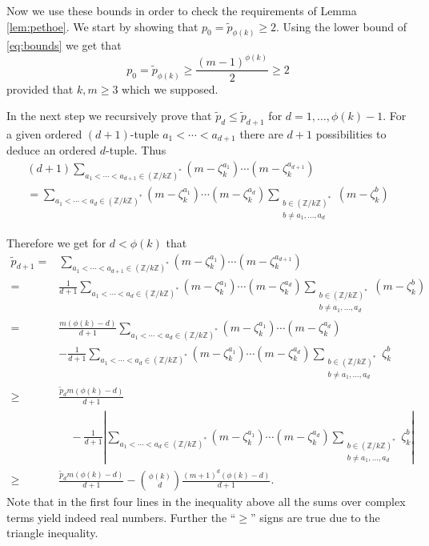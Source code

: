 \documentclass{amsart}
\theoremstyle{plain}
\numberwithin{equation}{section}
\theoremstyle{remark}
\begin{document}
Now we use these bounds in order to check the requirements of Lemma
\ref{lem:pethoe}. We start by showing that $p_0=\tilde p_{\phi(k)}\geq
2$. Using the lower bound of \eqref{eq:bounds} we get that
\[p_0=\tilde p_{\phi(k)}\geq\frac{(m-1)^{\phi(k)}}2\geq2\]
provided that $k,m\geq3$ which we supposed.

In the next step we recursively prove that $\tilde p_d\leq\tilde
p_{d+1}$ for $d=1,\ldots,\phi(k)-1$. For a given ordered $(d+1)$-tuple
$a_1<\cdots<a_{d+1}$ there are $d+1$ possibilities to deduce an
ordered $d$-tuple. Thus
\begin{multline*}(d+1)\sum_{a_1<\cdots<a_{d+1}\in({{\mathbb Z}}/k{{\mathbb Z}})^*}(m-\zeta_k^{a_1})\cdots(m-\zeta_k^{a_{d+1}})\\
=\sum_{a_1<\cdots<a_{d}\in({{\mathbb Z}}/k{{\mathbb Z}})^*}(m-\zeta_k^{a_1})\cdots(m-\zeta_k^{a_{d}})\sum_{\substack{b\in({{\mathbb Z}}/k{{\mathbb Z}})^*\\b\neq 
a_1,\ldots,a_d}}(m-\zeta_k^b)
\end{multline*}

Therefore we get for $d<\phi(k)$ that
\begin{align*}
\tilde p_{d+1}
=&\sum_{a_1<\cdots<a_{d+1}\in({{\mathbb Z}}/k{{\mathbb Z}})^*}(m-\zeta_k^{a_1})\cdots(m-\zeta_k^{a_{d+1}})\\
=&\frac{1}{d+1}\sum_{a_1<\cdots<a_{d}\in({{\mathbb Z}}/k{{\mathbb Z}})^*}(m-\zeta_k^{a_1})\cdots(m-\zeta_k^{a_{d}})\sum_{\substack{b\in({{\mathbb Z}}/k{{\mathbb Z}})^*\\ b\neq 
a_1,\ldots,a_d}}(m-\zeta_k^b)\\
=&\frac{m(\phi(k)-d)}{d+1}\sum_{a_1<\cdots<a_{d}\in({{\mathbb Z}}/k{{\mathbb Z}})^*}(m-\zeta_k^{a_1})\cdots(m-\zeta_k^{a_{d}})\\
&-\frac{1}{d+1}\sum_{a_1<\cdots<a_{d}\in({{\mathbb Z}}/k{{\mathbb Z}})^*}(m-\zeta_k^{a_1})\cdots(m-\zeta_k^{a_{d}})\sum_{\substack{b\in({{\mathbb Z}}/k{{\mathbb Z}})^*\\ b\neq 
a_1,\ldots,a_d}}\zeta_k^b\\
\geq& \frac{\tilde p_dm(\phi(k)-d)}{d+1}\\
&\quad-\frac{1}{d+1}\left|\sum_{a_1<\cdots<a_{d}\in({{\mathbb Z}}/k{{\mathbb Z}})^*}(m-\zeta_k^{a_1})\cdots(m-\zeta_k^{a_{d}})\sum_{\substack{b\in({{\mathbb Z}}/k{{\mathbb Z}})^*\\
b\neq a_1,\ldots,a_d}}\zeta_k^b \right|\\
\geq & \frac{\tilde p_dm(\phi(k)-d)}{d+1}-\binom{\phi(k)}{d}\frac{(m+1)^d(\phi(k)-d)}{d+1}.
\end{align*}
Note that in the first four lines in the inequality above all the sums
over complex terms yield indeed real numbers. Further the ``$\geq$''
signs are true due to the triangle inequality.
\end{document}
